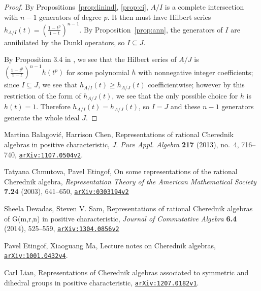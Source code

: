 \documentclass{article}
\numberwithin{equation}{section}
\newcommand{\arxiv}[1]{\href{http://arxiv.org/abs/#1}{{\tt arXiv:#1}}}
\begin{document}
\begin{proof} By Propositions~\ref{prop:linind}, \ref{prop:ci}, $A/I$ is a complete intersection with $n-1$ generators of degree $p$. It then must have Hilbert series $h_{A/I}(t)=\left(\frac{1-t^p}{1-t}\right)^{n-1}$. By Proposition~\ref{prop:ann}, the generators of $I$ are annihilated by the Dunkl operators, so $I \subseteq J$.

By Proposition 3.4 in \cite{BC1}, we see that the Hilbert series of $A/J$ is $\left(\frac{1-t^p}{1-t}\right)^{n-1}h(t^p)$ for some polynomial $h$ with nonnegative integer coefficients; since $I \subseteq J$, we see that $h_{A/I}(t) \ge h_{A/J}(t)$ coefficientwise; however by this restriction of the form of $h_{A/J}(t)$, we see that the only possible choice for $h$ is $h(t)=1$. Therefore $h_{A/I}(t)=h_{A/J}(t)$, so $I=J$ and these $n-1$ generators generate the whole ideal $J$.

\end{proof}







\begin{thebibliography}{2}

\setlength{\itemsep}{-1mm}
\small

 Martina Balagovi\'c, Harrison Chen, Representations of rational Cherednik algebras in positive characteristic, {\it J. Pure Appl. Algebra} {\bf 217} (2013), no.~4, 716--740, \arxiv{1107.0504v2}.

 Tatyana Chmutova, Pavel Etingof, On some representations of the rational Cherednik algebra, {\it Representation Theory of the American Mathematical Society} {\bf 7.24} (2003), 641--650, \arxiv{0303194v2}

 Sheela Devadas, Steven V. Sam, Representations of rational Cherednik algebras of G(m,r,n) in positive characteristic, {\it Journal of Commutative Algebra} {\bf 6.4} (2014), 525--559, \arxiv{1304.0856v2}

 Pavel Etingof, Xiaoguang Ma, Lecture notes on Cherednik algebras, \arxiv{1001.0432v4}.

 Carl Lian, Representations of Cherednik algebras associated to symmetric and dihedral groups in positive characteristic, \arxiv{1207.0182v1}.

\end{thebibliography}
\end{document}
